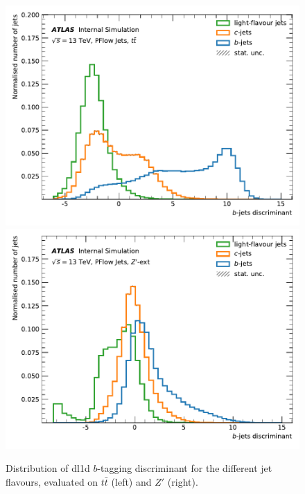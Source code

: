 %
\begin{center}
\begin{figure}[h!]
\centerline{
\includegraphics[scale=0.5]{Images//FTAG/Reprocessed/plotting_variables/scores_DL1_ttbar_300.pdf}
\includegraphics[scale=0.5]{Images//FTAG/Reprocessed/plotting_variables/scores_DL1_zprime_300.pdf}
}
\caption{Distribution of \gls{dl1d} $b$-tagging discriminant for the different jet flavours, evaluated on $t\bar{t}$ (left) and $Z'$ (right).}
\label{fig:score\gls{dl1d}tt}
\centerline{
}
\end{figure}
\end{center}
